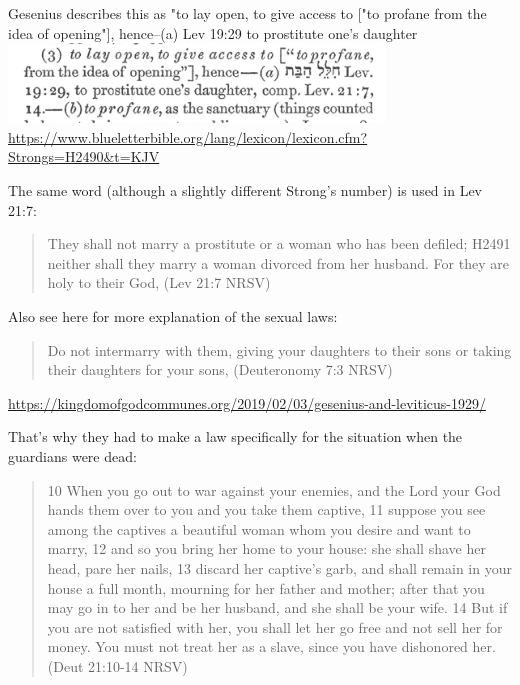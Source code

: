 \documentclass[11pt]{article}
\begin{document}
Gesenius describes this as "to lay open, to give access to ["to profane from the idea of opening"], hence--(a) Lev 19:29 to prostitute one's daughter\newline
\includegraphics[width=10cm]{chalal}
\url{https://www.blueletterbible.org/lang/lexicon/lexicon.cfm?Strongs=H2490&t=KJV}

The same word (although a slightly different Strong's number) is used in Lev 21:7:
\begin{quote}
They shall not marry a prostitute or a woman who has been defiled; H2491 neither shall they marry a woman divorced from her husband. For they are holy to their God, (Lev 21:7 NRSV)
\end{quote}
Also see here for more explanation of the sexual laws:
\begin{quote}
Do not intermarry with them, giving your daughters to their sons or taking their daughters for your sons,
(Deuteronomy 7:3 NRSV)
\end{quote}

\url{https://kingdomofgodcommunes.org/2019/02/03/gesenius-and-leviticus-1929/}

That’s why they had to make a law specifically for the situation when the guardians were dead:

\begin{quote}
10 When you go out to war against your enemies, and the Lord your God hands them over to you and you take them captive, 11 suppose you see among the captives a beautiful woman whom you desire and want to marry, 12 and so you bring her home to your house: she shall shave her head, pare her nails, 13 discard her captive’s garb, and shall remain in your house a full month, mourning for her father and mother; after that you may go in to her and be her husband, and she shall be your wife. 14 But if you are not satisfied with her, you shall let her go free and not sell her for money. You must not treat her as a slave, since you have dishonored her. (Deut 21:10-14 NRSV)
\end{quote}
\end{document}
